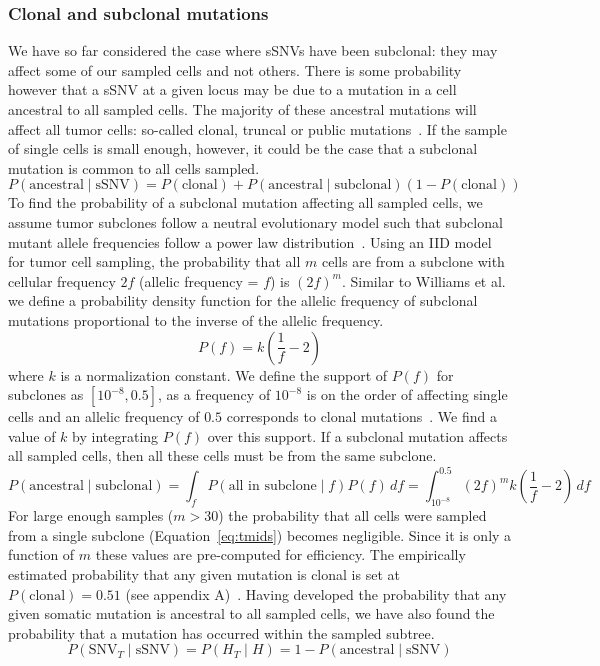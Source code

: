 \documentclass[../../main.tex]{subfiles}
\begin{document}
\subsubsection*{Clonal and subclonal mutations}
We have so far considered the case where sSNVs have been subclonal: they may affect some of our sampled cells and not others.
There is some probability however that a sSNV at a given locus may be due to a mutation in a cell ancestral to all sampled cells.
The majority of these ancestral mutations will affect all tumor cells: so-called clonal, truncal or public mutations~\cite{neutralevoltumour, 21breasts, metastatic}.
If the sample of single cells is small enough, however, it could be the case that a subclonal mutation is common to all cells sampled.
\begin{equation}
P(\text{ancestral}\mid \text{sSNV})=P(\text{clonal})+P(\text{ancestral}\mid \text{subclonal})(1-P(\text{clonal}))
\end{equation}
To find the probability of a subclonal mutation affecting all sampled cells, we assume tumor subclones follow a neutral evolutionary model such that subclonal mutant allele frequencies follow a power law distribution~\cite{neutralevoltumour}.
Using an IID model for tumor cell sampling, the probability that all $m$ cells are from a subclone with cellular frequency $2f$ (allelic frequency = $f$) is $(2f)^m$.
Similar to Williams et al.
we define a probability density function for the allelic frequency of subclonal mutations proportional to the inverse of the allelic frequency.\\
\begin{equation}
P(f) = k\left(\frac{1}{f}-2\right)
\end{equation}
where $k$ is a normalization constant.
We define the support of $P(f)$ for subclones as $[10^{-8},0.5]$, as a frequency of $10^{-8}$ is on the order of affecting single cells and an allelic frequency of $0.5$ corresponds to clonal mutations~\cite{numcells}.
We find a value of $k$ by integrating $P(f)$ over this support.
If a subclonal mutation affects all sampled cells, then all these cells must be from the same subclone.
\begin{equation} \label{eq:tmids}
P(\text{ancestral}\mid \text{subclonal}) = \int_f P(\text{all in subclone}\mid f)P(f)\,df=\int_{10^{-8}}^{0.5}(2f)^mk\left(\frac{1}{f}-2\right)\,df
\end{equation}
For large enough samples ($m>30$) the probability that all cells were sampled from a single subclone (Equation~\ref{eq:tmids}) becomes negligible.
Since it is only a function of $m$ these values are pre-computed for efficiency.
The empirically estimated probability that any given mutation is clonal is set at $P(\text{clonal})=0.51$ (see appendix A)~\cite{21breasts, metastatic, yachida}.
Having developed the probability that any given somatic mutation is ancestral to all sampled cells, we have also found the probability that a mutation has occurred within the sampled subtree.
\begin{equation*}
P(\text{SNV}_T\mid\text{sSNV})=P(H_T\mid H)=1-P(\text{ancestral}\mid\text{sSNV})
\end{equation*}
\end{document}
